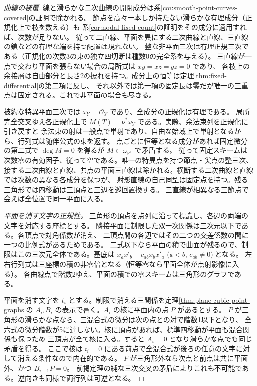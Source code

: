 \begin{proof}[曲線の被覆]
線と滑らかな二次曲線の開閉成分は系\ref{cor:smooth-point-curves-covered}の証明で除かれる。
節点を高々一本しか持たない滑らかな有理成分（正規化上で枝を数える）も
系\ref{cor:nodal-fixed-count}の証明をその成分に適用すれば、次数が足りない。
従って二直線、平面を異にする二次曲線と直線、三直線の鎖などの有理な端を持つ配置は現れない。
整な非平面三次は有理正規三次である（正規化の次数3の束の独立四切断は種数0の完全系を与える）。
三直線が一点で交わり平面を張らない場合の局所式は $xy=xz=yz=0$ であり、
各枝上の余接層は自由部分と長さ2の捩れを持つ。成分上の恒等は定理\ref{thm:fixed-differential}の第二項に反し、
それ以外では第一項の固定長は零だが唯一の三重点は固定される。これで非平面の場合も尽きる。

被約な特異平面三次では $\omega_Y=\mathcal O_Y$ であり、全成分の正規化は有理である。
局所完全交叉ゆえ各正規化上で $M(T)=\nu^*\omega_Y$ である。実際、余法束列を正規化に引き戻すと
余法束の射は一般点で単射であり、自由な始域上で単射となるから、行列式は随伴公式の束を返す。
点ごとに恒等となる成分があれば固定微分の第二式で $\deg M=0$ を得るが $M\subset\omega_{\mathbb P^1}$ で矛盾する。
従って固定スキームは次数零の有効因子、従って空である。唯一の特異点を持つ節点・尖点の整三次、
接する二次曲線と直線、共点の平面三直線は除かれる。横断する二次曲線と直線では次数の異なる各成分を保つが、
射影直線の自己同型は固定点を持つ。残る三角形では四移動は三頂点と三辺を巡回置換する。
三直線が相異なる三節点で会えば全位置で同一平面に入る。

\smallskip
\noindent\textit{平面を消す文字の正規性。}
三角形の頂点を点列に沿って標識し、各辺の両端の文字を対応する座標とする。
隣接平面に制限した双一次関係は三次元以下である。各頂点で対角係数が消え、
二頂点間の各辺ではその二つの交差係数の間に一つの比例式があるためである。
二式以下なら平面の積で曲面が残るので、制限はこの三次元全体である。基底は
$x_ax'_b-c_{ab}x_bx'_a$ ($a<b$, $c_{ab}\ne0$) となる。
左右行列式は三座標の積の非零倍となる（恒等零なら平面全体が点射影像に入る）。
各曲線点で階数2ゆえ、平面の積での零スキームは三角形のグラフである。

平面を消す文字を $t_i$ とする。制限で消える三関係を定理\ref{thm:plane-cubic-point-graphs}の
$A_i,B_i$ の表示で書く。$A_i$ の核に平面内の点 $P$ があるとする。
$P$ が三角形の滑らかな点なら、三混合式の微分は次の点との対で階数1以下となり、
全六式の微分階数が5に達しない。核に頂点があれば、標準四移動が平面も混合関係も保つため
三頂点が全て核に入る。すると $A_i=0$ となり滑らかな点でも同じ矛盾を得る。
ここで核は $t_i=0$ にある前点で全混合式が後ろの任意の文字に対して消える条件なので内在的である。
$P$ が三角形外なら次点と前点は共に平面外、かつ $B_{i-1}P=0$。
前掲定理の純な三次交叉の矛盾によりこれも不可能である。逆向きも同様で両行列は可逆となる。


\end{proof}
